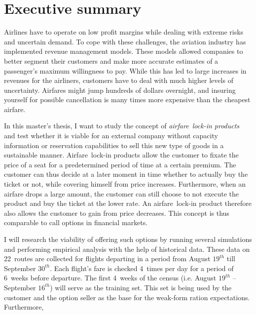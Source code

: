 \chapter{Executive summary}
Airlines have to operate on low profit margins while dealing with extreme risks and uncertain demand. To cope with these challenges, the aviation industry has implemented revenue management models. These models allowed companies to better segment their customers and make more accurate estimates of a passenger's maximum willingness to pay. While this has led to large increases in revenues for the airliners, customers have to deal with much higher levels of uncertainty. Airfares might jump hundreds of dollars overnight, and insuring yourself for possible cancellation is many times more expensive than the cheapest airfare.

In this master's thesis, I want to study the concept of \emph{airfare~lock-in products} and test whether it is viable for an external company without capacity information or reservation capabilities to sell this new type of goods in a sustainable manner. Airfare~lock-in products allow the customer to fixate the price of a seat for a predetermined period of time at a certain premium. The customer can thus decide at a later moment in time whether to actually buy the ticket or not, while covering himself from price increases. Furthermore, when an airfare drops a large amount, the customer can still choose to not execute the product and buy the ticket at the lower rate. An airfare~lock-in product therefore also allows the customer to gain from price decreases. This concept is thus comparable to call options in financial markets.

I will research the viability of offering such options by running several simulations and performing empirical analysis with the help of historical data. These data on 22~routes are collected for flights departing in a period from August $19^{th}$ till September $30^{th}$. Each flight's fare is checked 4~times per day for a period of 6~weeks before departure. The first 4~weeks of the census (i.e. August $19^{th}$ -- September $16^{th}$) will serve as the training set. This set is being used by the customer and the option seller as the base for the weak-form ration expectations. Furthermore,

